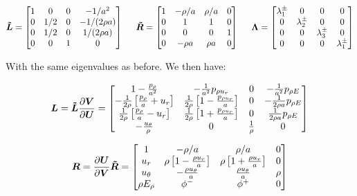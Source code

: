 \documentclass[10pt]{article}
\begin{document}
\begin{flushleft}
\begin{equation*}
\boldsymbol{\tilde{L}} = \begin{bmatrix}
    1 & 0 & 0 & -1 / a^2 \\
    0 & 1/2 & 0 & -1/(2 \rho a) \\
    0 & 1/2 & 0 & 1/(2 \rho a) \\
    0 & 0 & 1 & 0
\end{bmatrix}
\hspace{5mm}
\boldsymbol{\tilde{R}} = \begin{bmatrix}
    1 & -\rho/a & \rho/a & 0 \\
    0 & 1 & 1 & 0 \\
    0 & 0 & 0 & 1 \\
    0 & -\rho a & \rho a & 0
\end{bmatrix}
\hspace{5mm}
\boldsymbol{\Lambda} = \begin{bmatrix}
    \lambda_1^\pm & 0 & 0 & 0 \\
    0 & \lambda_2^\pm & 0 & 0 \\
    0 & 0 & \lambda_3^\pm & 0 \\
    0 & 0 & 0 & \lambda_1^\pm
\end{bmatrix}
\end{equation*}

With the same eigenvalues as before. We then have:

\begin{equation*}
    \boldsymbol{L} = \boldsymbol{\tilde{L}} \frac{\partial \boldsymbol{V}}{\partial \boldsymbol{U}} = \begin{bmatrix}
        1 -\frac{p_\rho}{a^2} & -\frac{1}{a^2} p_{\rho u_r} & 0 & -\frac{1}{a^2} p_{\rho E}\\
        -\frac{1}{2 \rho} \left[ \frac{p_\rho}{a} + u_r \right] & \frac{1}{2 \rho} \left[ 1 - \frac{p_{\rho u_r}}{a} \right] & 0 & -\frac{1}{2 \rho a} p_{\rho E} \\
        \frac{1}{2 \rho} \left[ \frac{p_\rho}{a} - u_r \right] & \frac{1}{2 \rho} \left[ 1 + \frac{p_{\rho u_r}}{a} \right] & 0 & \frac{1}{2 \rho a} p_{\rho E} \\
        -\frac{u_\theta}{\rho} & 0 & \frac{1}{\rho} & 0
        \end{bmatrix}
\end{equation*}

\begin{equation*}
    \boldsymbol{R} = \frac{\partial \boldsymbol{U}}{\partial \boldsymbol{V}} \boldsymbol{\tilde{R}} = \begin{bmatrix}
        1 & - \rho / a & \rho / a & 0 \\
        u_r & \rho \left[ 1-\frac{\rho u_r}{a} \right] & \rho \left[ 1+\frac{\rho u_r}{a} \right] & 0 \\
        u_\theta & -\frac{\rho u_\theta}{a} & \frac{\rho u_\theta}{a} & \rho \\
        \rho E_\rho & \phi^- & \phi^+ & 0
    \end{bmatrix}
\end{equation*}


\end{flushleft}
\end{document}
